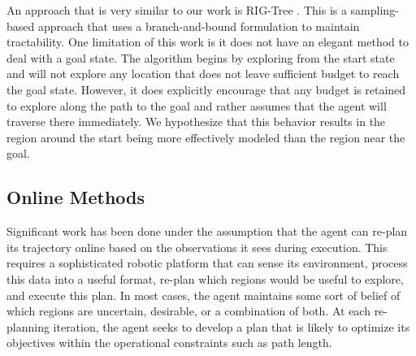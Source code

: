 An approach that is very similar to our work is RIG-Tree \cite{Hollinger2014Sampling-basedAlgorithms}. This is a sampling-based approach that uses a branch-and-bound formulation to maintain tractability. One limitation of this work is it does not have an elegant method to deal with a goal state. The algorithm begins by exploring from the start state and will not explore any location that does not leave sufficient budget to reach the goal state. However, it does explicitly encourage that any budget is retained to explore along the path to the goal and rather assumes that the agent will traverse there immediately. We hypothesize that this behavior results in the region around the start being more effectively modeled than the region near the goal.



\subsection{Online Methods}
Significant work has been done under the assumption that the agent can re-plan its trajectory online based on the observations it sees during execution. This requires a sophisticated robotic platform that can sense its environment, process this data into a useful format, re-plan which regions would be useful to explore, and execute this plan. In most cases, the agent maintains some sort of belief of which regions are uncertain, desirable, or a combination of both. At each re-planning iteration, the agent seeks to develop a plan that is likely to optimize its objectives within the operational constraints such as path length.

